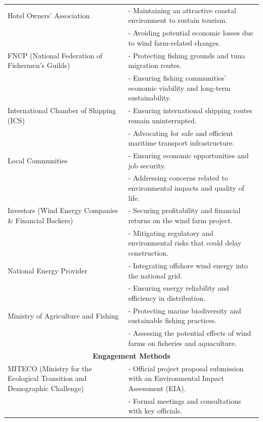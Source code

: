 \documentclass{article}
\begin{document}
\begin{longtable}{p{4cm} p{10cm}}
    Hotel Owners’ Association &
    - Maintaining an attractive coastal environment to sustain tourism. \\
    & - Avoiding potential economic losses due to wind farm-related changes. \\

    FNCP (National Federation of Fishermen’s Guilds) &
    - Protecting fishing grounds and tuna migration routes. \\
    & - Ensuring fishing communities' economic viability and long-term sustainability. \\

    International Chamber of Shipping (ICS) &
    - Ensuring international shipping routes remain uninterrupted. \\
    & - Advocating for safe and efficient maritime transport infrastructure. \\

    Local Communities &
    - Ensuring economic opportunities and job security. \\
    & - Addressing concerns related to environmental impacts and quality of life. \\

    Investors (Wind Energy Companies \& Financial Backers) &
    - Securing profitability and financial returns on the wind farm project. \\
    & - Mitigating regulatory and environmental risks that could delay construction. \\

    National Energy Provider &
    - Integrating offshore wind energy into the national grid. \\
    & - Ensuring energy reliability and efficiency in distribution. \\

    Ministry of Agriculture and Fishing &
    - Protecting marine biodiversity and sustainable fishing practices. \\
    & - Assessing the potential effects of wind farms on fisheries and aquaculture. \\

    \midrule
    \multicolumn{2}{c}{\textbf{Engagement Methods}} \\
    \midrule

    MITECO (Ministry for the Ecological Transition and Demographic Challenge) &
    - Official project proposal submission with an Environmental Impact Assessment (EIA). \\
    & - Formal meetings and consultations with key officials. \\


\end{longtable}
\end{document}
